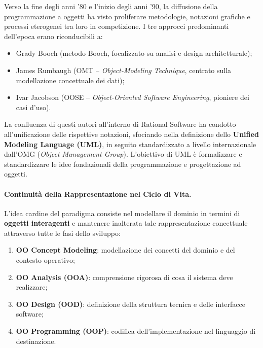 \documentclass[12pt]{extarticle}
\begin{document}
\noindent Verso la fine degli anni '80 e l'inizio degli anni '90, la diffusione della programmazione a oggetti ha visto proliferare metodologie, notazioni grafiche e processi eterogenei tra loro in competizione.  I tre approcci predominanti dell'epoca erano riconducibili a: 
\begin{itemize}
    \item Grady Booch (metodo Booch, focalizzato su analisi e design architetturale); 
    \item James Rumbaugh (OMT -- \textit{Object-Modeling Technique}, centrato sulla modellazione concettuale dei dati); 
    \item Ivar Jacobson (OOSE -- \textit{Object-Oriented Software Engineering}, pioniere dei casi d'uso). 
\end{itemize}
La confluenza di questi autori all'interno di Rational Software ha condotto all'unificazione delle rispettive notazioni, sfociando nella definizione dello \textbf{Unified Modeling Language (UML)}, in seguito standardizzato a livello internazionale dall'OMG (\textit{Object Management Group}).  L'obiettivo di UML è formalizzare e standardizzare le idee fondazionali della programmazione e progettazione ad oggetti. 

\paragraph{Continuità della Rappresentazione nel Ciclo di Vita.}
L'idea cardine del paradigma consiste nel modellare il dominio in termini di \textbf{oggetti interagenti} e mantenere inalterata tale rappresentazione concettuale attraverso tutte le fasi dello sviluppo: 
\begin{enumerate}
    \item \textbf{OO Concept Modeling}: modellazione dei concetti del dominio e del contesto operativo; 
    \item \textbf{OO Analysis (OOA)}: comprensione rigorosa di cosa il sistema deve realizzare; 
    \item \textbf{OO Design (OOD)}: definizione della struttura tecnica e delle interfacce software; 
    \item \textbf{OO Programming (OOP)}: codifica dell'implementazione nel linguaggio di destinazione. 
\end{enumerate}
\end{document}
